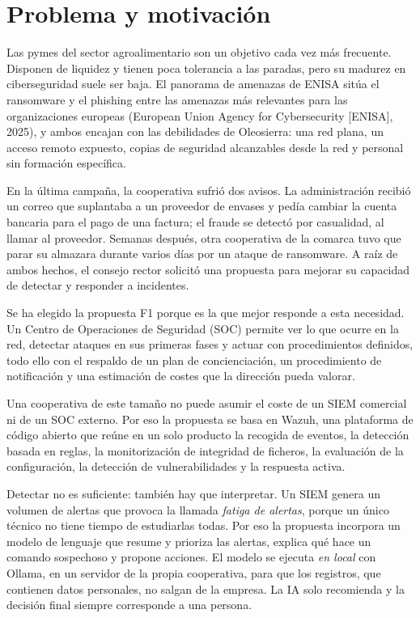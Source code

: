 \documentclass[11pt,a4paper,oneside]{report}
\begin{document}
\section{Problema y motivación}

Las pymes del sector agroalimentario son un objetivo cada vez más frecuente. Disponen de liquidez y tienen poca tolerancia a las paradas, pero su madurez en ciberseguridad suele ser baja. El panorama de amenazas de ENISA sitúa el ransomware y el phishing entre las amenazas más relevantes para las organizaciones europeas (European Union Agency for Cybersecurity [ENISA], 2025), y ambos encajan con las debilidades de Oleosierra: una red plana, un acceso remoto expuesto, copias de seguridad alcanzables desde la red y personal sin formación específica.

En la última campaña, la cooperativa sufrió dos avisos. La administración recibió un correo que suplantaba a un proveedor de envases y pedía cambiar la cuenta bancaria para el pago de una factura; el fraude se detectó por casualidad, al llamar al proveedor. Semanas después, otra cooperativa de la comarca tuvo que parar su almazara durante varios días por un ataque de ransomware. A raíz de ambos hechos, el consejo rector solicitó una propuesta para mejorar su capacidad de detectar y responder a incidentes.

Se ha elegido la propuesta F1 porque es la que mejor responde a esta necesidad. Un Centro de Operaciones de Seguridad (SOC) permite ver lo que ocurre en la red, detectar ataques en sus primeras fases y actuar con procedimientos definidos, todo ello con el respaldo de un plan de concienciación, un procedimiento de notificación y una estimación de costes que la dirección pueda valorar.

Una cooperativa de este tamaño no puede asumir el coste de un SIEM comercial ni de un SOC externo. Por eso la propuesta se basa en Wazuh, una plataforma de código abierto que reúne en un solo producto la recogida de eventos, la detección basada en reglas, la monitorización de integridad de ficheros, la evaluación de la configuración, la detección de vulnerabilidades y la respuesta activa.

Detectar no es suficiente: también hay que interpretar. Un SIEM genera un volumen de alertas que provoca la llamada \emph{fatiga de alertas}, porque un único técnico no tiene tiempo de estudiarlas todas. Por eso la propuesta incorpora un modelo de lenguaje que resume y prioriza las alertas, explica qué hace un comando sospechoso y propone acciones. El modelo se ejecuta \emph{en local} con Ollama, en un servidor de la propia cooperativa, para que los registros, que contienen datos personales, no salgan de la empresa. La IA solo recomienda y la decisión final siempre corresponde a una persona.
\end{document}
